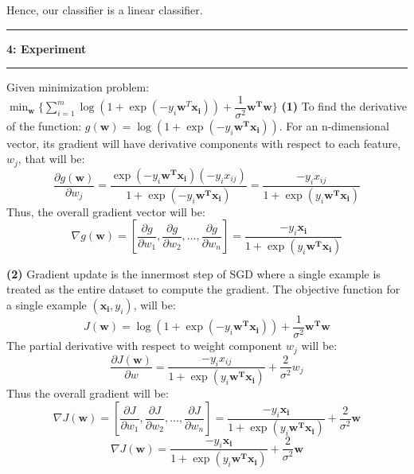 \documentclass{article}
\newcommand\question[2]{\vspace{.25in}\hrule\textbf{#1: #2}\hrule\vspace{.10in}}
\renewcommand\part[1]{\vspace{.10in}\textbf{(#1)}}
\begin{document}
	Hence, our classifier is a linear classifier. 

	\question{4}{Experiment}
	Given minimization problem: $\min_{\mathbf{w}}\{ \sum_{i=1}^m \log(1 + \exp(-y_i\mathbf{w}^T\mathbf{x_i})) + \dfrac{1}{\sigma^2}\mathbf{w^Tw} \}$
	\part{1} To find the derivative of the function: $g(\mathbf{w}) = \log(1 + \exp(-y_i\mathbf{w^Tx_i}))$. For an n-dimensional vector, its gradient will have derivative components with respect to each feature,$w_j$, that will be:
	\[ \dfrac{\partial g(\mathbf{w})}{\partial w_j} = \dfrac{\exp(-y_i\mathbf{w^Tx_i})(-y_ix_{ij})}{1 + \exp(-y_i\mathbf{w^Tx_i})} = \dfrac{-y_ix_{ij}}{1 + \exp(y_i\mathbf{w^Tx_i})}\]
	Thus, the overall gradient vector will be:
	\[\nabla g(\mathbf{w}) = [\dfrac{\partial g}{\partial w_1},\dfrac{\partial g}{\partial w_2}, \dots, \dfrac{\partial g}{\partial w_n}] = \dfrac{-y_i\mathbf{x_i}}{1 + \exp(y_i\mathbf{w^Tx_i})}\]

	\part{2} Gradient update is the innermost step of SGD where a single example is treated as the entire dataset to compute the gradient. The objective function for a single example $(\mathbf{x_i},y_i)$, will be:
	\[ J(\mathbf{w}) = \log(1 + \exp(-y_i\mathbf{w^Tx_i})) + \dfrac{1}{\sigma^2}\mathbf{w^Tw} \]
	The partial derivative with respect to weight component $w_j$ will be:
	\[ \dfrac{\partial J(\mathbf{w})}{\partial w} = \dfrac{-y_ix_{ij}}{1 + \exp(y_i\mathbf{w^Tx_i})} + \dfrac{2}{\sigma^2}w_j \]
	Thus the overall gradient will be:
	\[\nabla J(\mathbf{w}) = [\dfrac{\partial J}{\partial w_1},\dfrac{\partial J}{\partial w_2}, \dots, \dfrac{\partial J}{\partial w_n}] = \dfrac{-y_i\mathbf{x_i}}{1 + \exp(y_i\mathbf{w^Tx_i})} + \dfrac{2}{\sigma^2}\mathbf{w}  \]
	\begin{equation}
	\nabla J(\mathbf{w}) = \dfrac{-y_i\mathbf{x_i}}{1 + \exp(y_i\mathbf{w^Tx_i})} + \dfrac{2}{\sigma^2}\mathbf{w} 
		\label{eq:grad}
	\end{equation}
\end{document}
